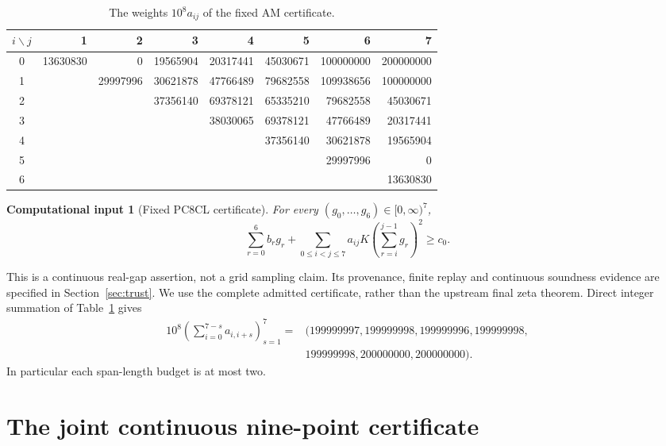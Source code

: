 \documentclass[11pt,a4paper]{article}
\newtheorem{inputclaim}[theorem]{Computational input}
\theoremstyle{remark}
\begin{document}
\begin{table}[ht]
\centering\small
\begin{tabular}{c*{7}{r}}
\toprule
$i\backslash j$&1&2&3&4&5&6&7\\
\midrule
0&13630830&0&19565904&20317441&45030671&100000000&200000000\\
1&&29997996&30621878&47766489&79682558&109938656&100000000\\
2&&&37356140&69378121&65335210&79682558&45030671\\
3&&&&38030065&69378121&47766489&20317441\\
4&&&&&37356140&30621878&19565904\\
5&&&&&&29997996&0\\
6&&&&&&&13630830\\
\bottomrule
\end{tabular}
\caption{The weights $10^8a_{ij}$ of the fixed AM certificate.}
\label{tab:weights}
\end{table}

\begin{inputclaim}[Fixed PC8CL certificate]\label{in:pc8}
For every $(g_0,\ldots,g_6)\in[0,\infty)^7$,
\begin{equation}\label{eq:local}
 \sum_{r=0}^6b_rg_r+
 \sum_{0\le i<j\le7}a_{ij}
 K\left(\sum_{r=i}^{j-1}g_r\right)^2\ge c_0.
\end{equation}
\end{inputclaim}

This is a continuous real-gap assertion, not a grid sampling claim.
Its provenance, finite replay and continuous soundness evidence are
specified in Section~\ref{sec:trust}. We use the complete admitted
certificate, rather than the upstream final zeta theorem.
Direct integer summation of Table~\ref{tab:weights} gives
\begin{equation}\label{eq:capacity}
\begin{split}
10^8\left(\sum_{i=0}^{7-s}a_{i,i+s}\right)_{s=1}^7
={}&(199999997,199999998,199999996,199999998,\\
 &199999998,200000000,200000000).
\end{split}
\end{equation}
In particular each span-length budget is at most two.

\section{The joint continuous nine-point certificate}\label{sec:joint}
\end{document}
